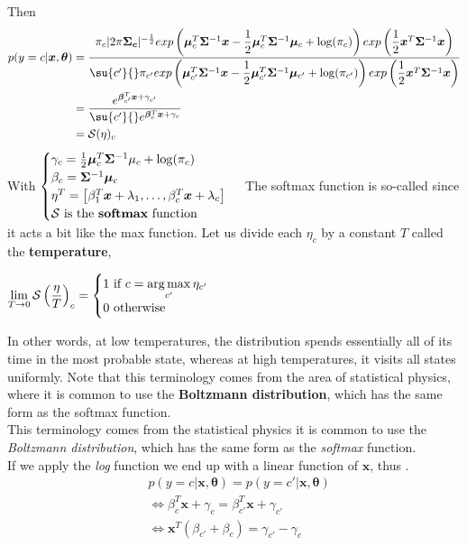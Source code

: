 Then
\begin{align*}
    p(y=c|\bm{x},\bm{\theta})
    &=\dfrac{\pi_{c}\lvert 2\pi\bm{\Sigma_{c}}\rvert^{-\frac{1}{2}}exp\left(
            \bm{\mu}_{c}^{T}\bm{\Sigma}^{-1}\bm{x} -\dfrac{1}{2}\bm{\mu}_{c}^{T}
        \bm{\Sigma}^{-1}\bm{\mu}_{c} + \log(\pi_{c})\right)exp\left(
        \dfrac{1}{2}\bm{x}^{T} \bm{\Sigma}^{-1}\bm{x}\right)}
    {\su{c'}{}\pi_{c'}exp\left( \bm{\mu}_{c'}^{T}\bm{\Sigma}^{-1}\bm{x} -\dfrac{1}{2}
        \bm{\mu}_{c'}^{T} \bm{\Sigma}^{-1}\bm{\mu}_{c'} + \log(\pi_{c'})\right)exp\left(
        \dfrac{1}{2}\bm{x}^{T} \bm{\Sigma}^{-1}\bm{x}\right)}\\
    &= \dfrac{e^{\bm{\beta}_{c'}^{T}\bm{x}+\gamma_{c'}}}
    {\su{c'}{}e^{\bm{\beta}_{c}^{T}\bm{x}+\gamma_{c}}}\\
    &= \mathcal{S}(\eta)_{c}
\end{align*}
With 
$ \begin{cases}
    \gamma_{c} = \frac{1}{2}\bm{\mu}_{c}^{T}\bm{\Sigma}^{-1}\mu_{c} + \log(\pi_{c})\\
    \beta_{c} = \bm{\Sigma}^{-1}\bm{\mu}_{c}\\
    \eta^{T} = \left[\beta_{1}^{T}\bm{x}+\lambda_{1}, \ldots, 
    \beta_{c}^{T}\bm{x}+\lambda_{c}\right]\\
    \mathcal{S}\text{ is the \textbf{softmax} function}
\end{cases} $
The softmax function is so-called since it acts a bit like the max function.
Let us divide each $\eta_{c}$ by a constant $T$ called the \textbf{temperature}, 
\begin{center}
    $\displaystyle\lim_{T\to 0}\mathcal{S}\left(\frac{\eta}{T}\right)_{c} = 
    \begin{cases}
        1 \text{ if } c=\displaystyle\operatorname*{arg\,max}_{c'}\eta_{c'}\\
        0 \text{ otherwise}
    \end{cases}$
\end{center}
In other words, at low temperatures, the distribution spends essentially all of its time
in the most probable state, whereas at high temperatures, it visits all states uniformly.
Note that this terminology comes from the area of statistical physics, where it is common
to use the \textbf{Boltzmann distribution}, which has the same form as the softmax
function.\\
This terminology comes from the statistical physics it is common to use the 
\emph{Boltzmann distribution}, which has the same form as the \emph{softmax} function.\\
If we apply the \emph{log} function we end up with a linear function of $\bm{x}$, thus 
.
\begin{align*}
    & p(y=c|\bm{x},\bm{\theta}) = p(y=c'|\bm{x},\bm{\theta}) \\
&\Leftrightarrow \beta_{c}^{T}\bm{x} + \gamma_{c} = \beta_{c'}^{T}\bm{x} + \gamma_{c'}\\
&\Leftrightarrow \bm{x}^{T}(\beta_{c'} + \beta_{c}) = \gamma_{c'} - \gamma_{c}
\end{align*}

